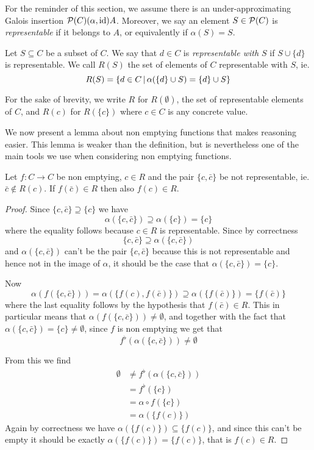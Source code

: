 For the reminder of this section, we assume there is an under-approximating Galois insertion $\mathcal{P}(C) (\alpha, \text{id}) A$. Moreover, we say an element $S \in \mathcal{P}(C)$ is \textit{representable} if it belongs to $A$, or equivalently if $\alpha(S) = S$.

\begin{definition}\label{ch3:def:repr-with-set}
	Let $S \subseteq C$ be a subset of $C$. We say that $d \in C$ is \textit{representable with $S$} if $S \cup \{ d \}$ is representable. We call $R(S)$ the set of elements of $C$ representable with $S$, ie.
	\[
	R(S) = \{ d \in C \,\vert\, \alpha(\{ d \} \cup S) = \{ d \} \cup S \}
	\]
\end{definition}
For the sake of brevity, we write $R$ for $R(\emptyset)$, the set of representable elements of $C$, and $R(c)$ for $R(\{ c \})$ where $c \in C$ is any concrete value.

We now present a lemma about non emptying functions that makes reasoning easier. This lemma is weaker than the definition, but is nevertheless one of the main tools we use when considering non emptying functions.

\begin{lemma}\label{ch3:th:f-non-repr-pair}
	Let $f: C \rightarrow C$ be non emptying, $c \in R$ and the pair $\{ c, \bar{c} \}$ be not representable, ie. $\bar{c} \notin R(c)$. If $f(\bar{c}) \in R$ then also $f(c) \in R$.
\end{lemma}
\begin{proof}
	Since $\{ c, \bar{c} \} \supseteq \{ c \}$ we have
	\[
	\alpha(\{ c, \bar{c} \}) \supseteq \alpha(\{ c \}) = \{ c \}
	\]
	where the equality follows because $c \in R$ is representable. Since by correctness
	\[
	\{ c, \bar{c} \} \supseteq \alpha(\{ c, \bar{c} \})
	\]
	and $\alpha(\{ c, \bar{c} \})$ can't be the pair $\{ c, \bar{c} \}$ because this is not representable and hence not in the image of $\alpha$, it should be the case that $\alpha(\{ c, \bar{c} \}) = \{ c \}$.
	
	Now
	\[
	\alpha(f(\{ c, \bar{c} \})) = \alpha(\{ f(c), f(\bar{c}) \}) \supseteq \alpha(\{ f(\bar{c}) \}) = \{ f(\bar{c}) \}
	\]
	where the last equality follows by the hypothesis that $f(\bar{c}) \in R$.
	This in particular means that $\alpha(f(\{ c, \bar{c} \})) \neq \emptyset$, and together with the fact that $\alpha(\{ c, \bar{c} \}) = \{ c \} \neq \emptyset$, since $f$ is non emptying we get that
	\[
	f^{\flat}(\alpha(\{ c, \bar{c} \})) \neq \emptyset
	\]
	
	From this we find
	\begin{align*}
		\emptyset &\neq f^{\flat}(\alpha(\{ c, \bar{c} \})) \\
		&= f^{\flat}(\{ c \}) \\
		&= \alpha \circ f(\{ c \}) \\
		&= \alpha(\{ f(c) \})
	\end{align*}
	Again by correctness we have $\alpha(\{ f(c) \}) \subseteq \{ f(c)\}$, and since this can't be empty it should be exactly $\alpha(\{ f(c) \}) = \{ f(c) \}$, that is $f(c) \in R$.
\end{proof}

